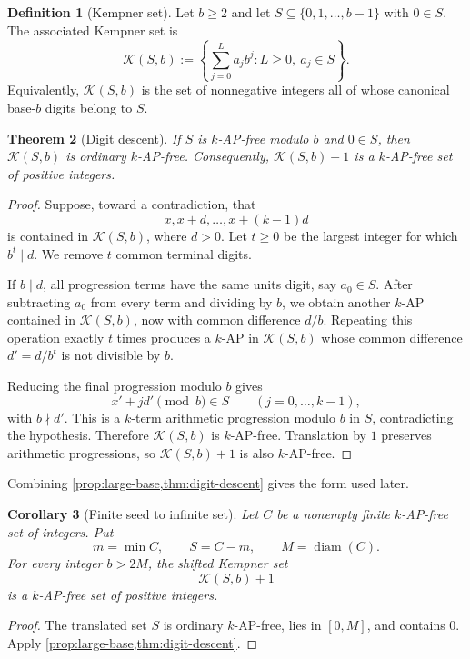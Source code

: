 \documentclass[11pt]{article}
\newtheorem{theorem}{Theorem}[section]
\newtheorem{corollary}[theorem]{Corollary}
\theoremstyle{definition}
\newtheorem{definition}[theorem]{Definition}
\theoremstyle{remark}
\newcommand{\Kemp}{\mathcal{K}}
\newcommand{\diam}{\operatorname{diam}}
\begin{document}
\begin{definition}[Kempner set]\label{def:kempner}
Let $b\ge 2$ and let $S\subseteq\{0,1,\ldots,b-1\}$ with $0\in S$.  The
associated Kempner set is
\[
 \Kemp(S,b):=
 \left\{
   \sum_{j=0}^{L} a_jb^j:
   L\ge 0,\ a_j\in S
 \right\}.
\]
Equivalently, $\Kemp(S,b)$ is the set of nonnegative integers all of whose
canonical base-$b$ digits belong to $S$.
\end{definition}

\begin{theorem}[Digit descent]\label{thm:digit-descent}
If $S$ is $k$-AP-free modulo $b$ and $0\in S$, then $\Kemp(S,b)$ is
ordinary $k$-AP-free.  Consequently, $\Kemp(S,b)+1$ is a $k$-AP-free set of
positive integers.
\end{theorem}

\begin{proof}
Suppose, toward a contradiction, that
\[
 x,x+d,\ldots,x+(k-1)d
\]
is contained in $\Kemp(S,b)$, where $d>0$.  Let $t\ge 0$ be the largest
integer for which $b^t\mid d$.  We remove $t$ common terminal digits.

If $b\mid d$, all progression terms have the same units digit, say
$a_0\in S$.  After subtracting $a_0$ from every term and dividing by $b$,
we obtain another $k$-AP contained in $\Kemp(S,b)$, now with common
difference $d/b$.  Repeating this operation exactly $t$ times produces a
$k$-AP in $\Kemp(S,b)$ whose common difference $d'=d/b^t$ is not divisible
by $b$.

Reducing the final progression modulo $b$ gives
\[
 x'+jd'\pmod b\in S
 \qquad (j=0,\ldots,k-1),
\]
with $b\nmid d'$.  This is a $k$-term arithmetic progression modulo $b$ in
$S$, contradicting the hypothesis.  Therefore $\Kemp(S,b)$ is $k$-AP-free.
Translation by $1$ preserves arithmetic progressions, so
$\Kemp(S,b)+1$ is also $k$-AP-free.
\end{proof}

Combining \cref{prop:large-base,thm:digit-descent} gives the form used later.

\begin{corollary}[Finite seed to infinite set]\label{cor:finite-seed}
Let $C$ be a nonempty finite $k$-AP-free set of integers.  Put
\[
 m=\min C,
 \qquad
 S=C-m,
 \qquad
 M=\diam(C).
\]
For every integer $b>2M$, the shifted Kempner set
\[
 \Kemp(S,b)+1
\]
is a $k$-AP-free set of positive integers.
\end{corollary}

\begin{proof}
The translated set $S$ is ordinary $k$-AP-free, lies in $[0,M]$, and
contains $0$.  Apply \cref{prop:large-base,thm:digit-descent}.
\end{proof}
\end{document}
